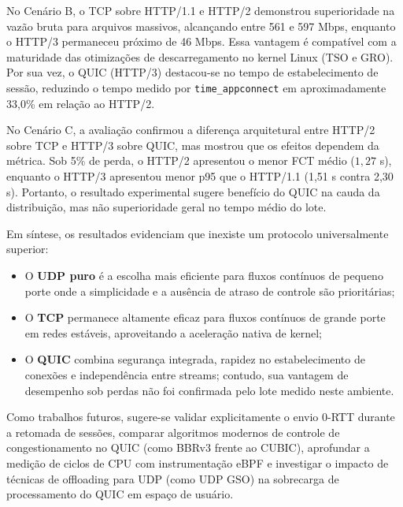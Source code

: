 \documentclass[12pt]{article}
\begin{document}
No Cenário B, o TCP sobre HTTP/1.1 e HTTP/2 demonstrou superioridade na vazão bruta para arquivos massivos, alcançando entre 561 e 597 Mbps, enquanto o HTTP/3 permaneceu próximo de 46 Mbps. Essa vantagem é compatível com a maturidade das otimizações de descarregamento no kernel Linux (TSO e GRO). Por sua vez, o QUIC (HTTP/3) destacou-se no tempo de estabelecimento de sessão, reduzindo o tempo medido por \texttt{time\_appconnect} em aproximadamente 33,0\% em relação ao HTTP/2.

No Cenário C, a avaliação confirmou a diferença arquitetural entre HTTP/2 sobre TCP e HTTP/3 sobre QUIC, mas mostrou que os efeitos dependem da métrica. Sob 5\% de perda, o HTTP/2 apresentou o menor FCT médio ($1{,}27$ s), enquanto o HTTP/3 apresentou menor p95 que o HTTP/1.1 (1,51 s contra 2,30 s). Portanto, o resultado experimental sugere benefício do QUIC na cauda da distribuição, mas não superioridade geral no tempo médio do lote.

Em síntese, os resultados evidenciam que inexiste um protocolo universalmente superior:
\begin{itemize}
  \item O \textbf{UDP puro} é a escolha mais eficiente para fluxos contínuos de pequeno porte onde a simplicidade e a ausência de atraso de controle são prioritárias;
  \item O \textbf{TCP} permanece altamente eficaz para fluxos contínuos de grande porte em redes estáveis, aproveitando a aceleração nativa de kernel;
  \item O \textbf{QUIC} combina segurança integrada, rapidez no estabelecimento de conexões e independência entre streams; contudo, sua vantagem de desempenho sob perdas não foi confirmada pelo lote medido neste ambiente.
\end{itemize}

Como trabalhos futuros, sugere-se validar explicitamente o envio 0-RTT durante a retomada de sessões, comparar algoritmos modernos de controle de congestionamento no QUIC (como BBRv3 frente ao CUBIC), aprofundar a medição de ciclos de CPU com instrumentação eBPF e investigar o impacto de técnicas de offloading para UDP (como UDP GSO) na sobrecarga de processamento do QUIC em espaço de usuário.




\end{document}
